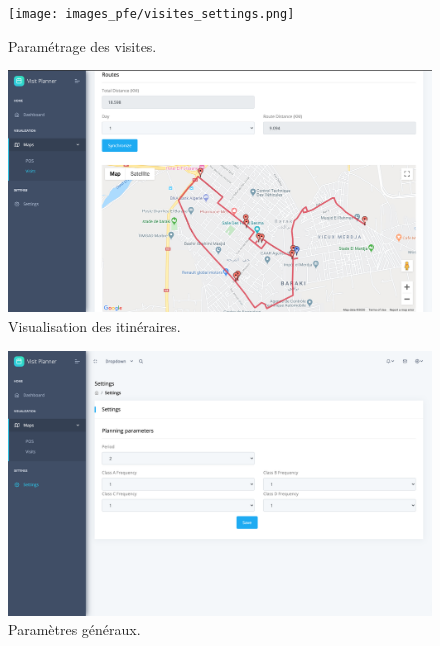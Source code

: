 \begin{figure}[hbt!]
  \centering
  \texttt{[image: images\_pfe/visites\_settings.png]}
  \caption{Paramétrage des visites.}
  \label{fig:routes-settings-page}
\end{figure}
\FloatBarrier


\begin{figure}[hbt!]
  \centering
  \includegraphics[width=15cm]{images_pfe/route_visualization.png}
  \caption{Visualisation des itinéraires.}
  \label{fig:routes-visualization-page}
\end{figure}
\FloatBarrier

\begin{figure}[hbt!]
  \centering
  \includegraphics[width=15cm]{images_pfe/settings_page.png}
  \caption{Paramètres généraux.}
  \label{fig:general-settings-page}
\end{figure}
\FloatBarrier


